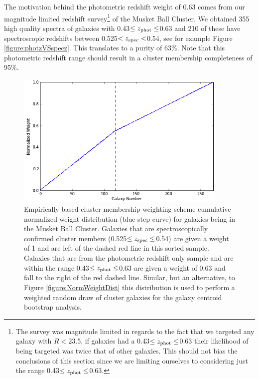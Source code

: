 The motivation behind the photometric redshift weight of 0.63 comes from our magnitude limited redshift survey\footnote{The survey was magnitude limited in regards to the fact that we targeted any galaxy with $R<$23.5, if galaxies had a 0.43$\leq z_{\rm phot} \leq$0.63 their likelihood of being targeted was twice that of other galaxies. This should not bias the conclusions of this section since we are limiting ourselves to considering just the range 0.43$\leq z_{\rm phot} \leq$0.63.}
of the Musket Ball Cluster.
We obtained 355 high quality spectra of galaxies with 0.43$\leq z_{\rm phot} \leq$0.63 and 210 of these have spectroscopic redshifts between 0.525$<z_{\rm spec}<$0.54, see for example Figure \ref{figure:photzVSspecz}.
This translates to a purity of 63\%.
Note that this photometric redshift range should result in a cluster membership completeness of 95\%.

\begin{figure}
\centering
\includegraphics[width=4in]{Chapter4/AnalysisFiles/cumnormwghtdist_zclip_photozpenalty.png}
\caption[Empirically based cluster membership weighting scheme; cumulative normalized weight distribution for galaxies being in the Musket Ball Cluster.]{
Empirically based cluster membership weighting scheme cumulative normalized weight distribution (blue step curve) for galaxies being in the Musket Ball Cluster. 
Galaxies that are spectroscopically confirmed cluster members (0.525$\leq z_{\rm spec} \leq$0.54) are given a weight of 1 and are left of the dashed red line in this sorted sample.
Galaxies that are from the photometric redshift only sample and are within the range 0.43$\leq z_{\rm phot} \leq$0.63 are given a weight of 0.63 and fall to the right of the red dashed line.
Similar, but an alternative, to Figure \ref{figure:NormWeightDist} this distribution is used to perform a weighted random draw of cluster galaxies for the galaxy centroid bootstrap analysis.
}
\label{figure:NormPenaltyWeightDist}
\end{figure}


